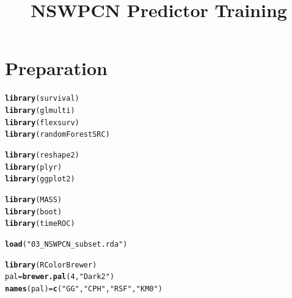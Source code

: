 \documentclass{article}\usepackage[]{graphicx}\usepackage[]{color}
\makeatletter
\newcommand{\hlnum}[1]{\textcolor[rgb]{0.686,0.059,0.569}{#1}}%
\newcommand{\hlstr}[1]{\textcolor[rgb]{0.192,0.494,0.8}{#1}}%
\newcommand{\hlstd}[1]{\textcolor[rgb]{0.345,0.345,0.345}{#1}}%
\newcommand{\hlkwb}[1]{\textcolor[rgb]{0.69,0.353,0.396}{#1}}%
\newcommand{\hlkwd}[1]{\textcolor[rgb]{0.737,0.353,0.396}{\textbf{#1}}}%
\newenvironment{kframe}{%
 \def\at@end@of@kframe{}%
 \ifinner\ifhmode%
  \def\at@end@of@kframe{\end{minipage}}%
  \begin{minipage}{\columnwidth}%
 \fi\fi%
 \def\FrameCommand##1{\hskip\@totalleftmargin \hskip-\fboxsep
 \colorbox{shadecolor}{##1}\hskip-\fboxsep
     \hskip-\linewidth \hskip-\@totalleftmargin \hskip\columnwidth}%
 \MakeFramed {\advance\hsize-\width
   \@totalleftmargin\z@ \linewidth\hsize
   \@setminipage}}%
 {\par\unskip\endMakeFramed%
 \at@end@of@kframe}
\newenvironment{knitrout}{}{} %
\makeatother
\begin{document}
\title{NSWPCN Predictor Training}
\maketitle

\section{Preparation}
\begin{knitrout}
\color{fgcolor}\begin{kframe}
\begin{alltt}
\hlkwd{library}\hlstd{(survival)}
\hlkwd{library}\hlstd{(glmulti)}
\hlkwd{library}\hlstd{(flexsurv)}
\hlkwd{library}\hlstd{(randomForestSRC)}

\hlkwd{library}\hlstd{(reshape2)}
\hlkwd{library}\hlstd{(plyr)}
\hlkwd{library}\hlstd{(ggplot2)}

\hlkwd{library}\hlstd{(MASS)}
\hlkwd{library}\hlstd{(boot)}
\hlkwd{library}\hlstd{(timeROC)}

\hlkwd{load}\hlstd{(}\hlstr{"03_NSWPCN_subset.rda"}\hlstd{)}

\hlkwd{library}\hlstd{(RColorBrewer)}
\hlstd{pal} \hlkwb{=} \hlkwd{brewer.pal}\hlstd{(}\hlnum{4}\hlstd{,} \hlstr{"Dark2"}\hlstd{)}
\hlkwd{names}\hlstd{(pal)} \hlkwb{=} \hlkwd{c}\hlstd{(}\hlstr{"GG"}\hlstd{,} \hlstr{"CPH"}\hlstd{,} \hlstr{"RSF"}\hlstd{,} \hlstr{"KM0"}\hlstd{)}
\end{alltt}
\end{kframe}
\end{knitrout}


\end{document}
